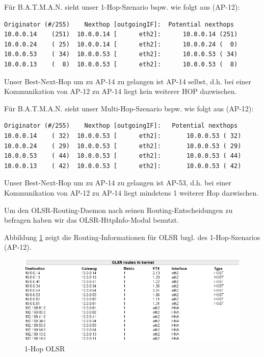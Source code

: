 \documentclass[a4paper,10pt]{article}
\begin{document}
Für B.A.T.M.A.N. sieht unser 1-Hop-Szenario bspw. wie folgt aus (AP-12):

\begin{lstlisting}
Originator (#/255)    Nexthop [outgoingIF]:  Potential nexthops
10.0.0.14    (251)  10.0.0.14 [      eth2]:      10.0.0.14 (251) 
10.0.0.24    ( 25)  10.0.0.14 [      eth2]:      10.0.0.24 (  0)
10.0.0.53    ( 34)  10.0.0.53 [      eth2]:      10.0.0.53 ( 34) 
10.0.0.13    (  8)  10.0.0.53 [      eth2]:      10.0.0.53 (  8)  
\end{lstlisting}

Unser Best-Next-Hop um zu AP-14 zu gelangen ist AP-14 selbst, d.h. bei einer Kommunikation von AP-12 zu AP-14 liegt kein weiterer HOP dazwischen.

Für B.A.T.M.A.N. sieht unser Multi-Hop-Szenario bspw. wie folgt aus (AP-12):

\begin{lstlisting}
Originator (#/255)    Nexthop [outgoingIF]:   Potential nexthops
10.0.0.14    ( 32)  10.0.0.53 [      eth2]:       10.0.0.53 ( 32)
10.0.0.24    ( 29)  10.0.0.53 [      eth2]:       10.0.0.53 ( 29)
10.0.0.53    ( 44)  10.0.0.53 [      eth2]:       10.0.0.53 ( 44)
10.0.0.13    ( 42)  10.0.0.53 [      eth2]:       10.0.0.53 ( 42)
\end{lstlisting}

Unser Best-Next-Hop um zu AP-14 zu gelangen ist AP-53, d.h. bei einer Kommunikation von AP-12 zu AP-14 liegt mindstens 1 weiterer Hop dazwischen.

Um den OLSR-Routing-Daemon nach seinen Routing-Entscheidungen zu befragen haben wir das OLSR-HttpInfo-Modul benutzt.

Abbildung \ref{1hop_olsr} zeigt die Routing-Informationen für OLSR bzgl. des 1-Hop-Szenarios (AP-12).

\begin{center}
  \begin{figure}[thb]
    \includegraphics[width=1\textwidth]{1hop_olsr.png}
    \caption{1-Hop OLSR}
    \label{1hop_olsr}
  \end{figure}
\end{center}
\end{document}
